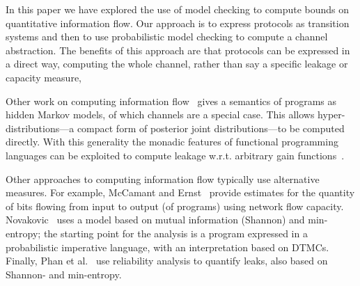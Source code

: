 In this paper we have explored the use of model checking to compute bounds on quantitative information flow.
Our approach is to express protocols as transition systems and then to use probabilistic model checking to 
compute a channel abstraction. 
The benefits of this approach are that protocols can be expressed in a direct way, 
 computing the whole channel, rather than say a specific leakage or capacity measure,
 
Other work on computing information flow~\cite{McIver:15:LICS} gives a semantics of programs as hidden 
Markov models, of which channels are a special case.  
This allows hyper-distributions---a compact form of posterior joint distributions---to be computed directly. 
With this generality the monadic features of functional programming languages can be exploited to compute 
leakage w.r.t. arbitrary gain functions~\cite{Morgan:17:TechRep}.

Other approaches to computing information flow typically use alternative measures. 
For example, McCamant and Ernst~\cite{McCamant:08:SIGPLAN} provide estimates for the quantity of bits 
flowing from input to output (of programs) using network flow capacity. 
Novakovic~\cite{Novakovic:14:Thesis} uses a model based on mutual information (Shannon) and min-entropy; 
the starting point for the analysis is a program expressed in a probabilistic imperative language, 
with an interpretation based on DTMCs.  
Finally, Phan et al.~\cite{Phan:14:SPIN} use reliability analysis to quantify leaks, also 
based on Shannon- and min-entropy.



